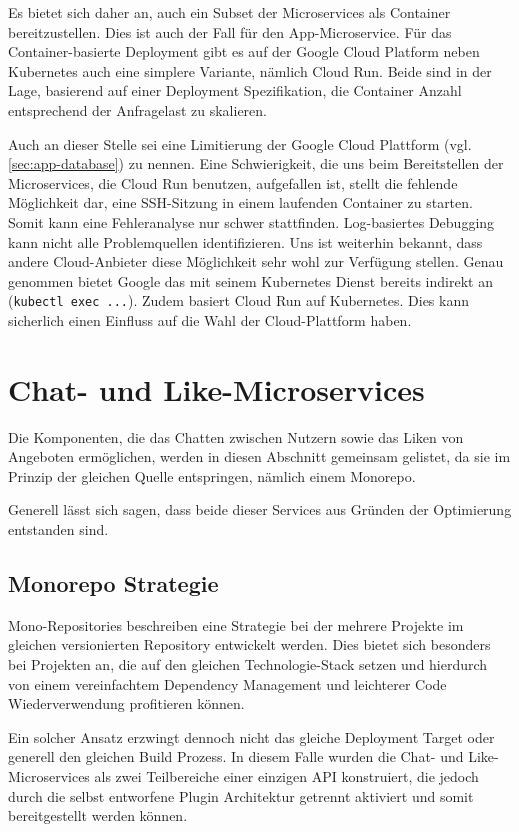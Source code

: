 \documentclass{article}
\begin{document}
Es bietet sich daher an, auch ein Subset der Microservices als Container bereitzustellen. Dies ist auch der Fall für den App-Microservice.  Für das Container-basierte Deployment gibt es auf der Google Cloud Platform neben Kubernetes auch eine simplere Variante, nämlich Cloud Run. Beide sind in der Lage, basierend auf einer Deployment Spezifikation, die Container Anzahl entsprechend der Anfragelast zu skalieren.

Auch an dieser Stelle sei eine Limitierung der Google Cloud Plattform (vgl. \autoref{sec:app-database}) zu nennen. Eine Schwierigkeit, die uns beim Bereitstellen der Microservices, die Cloud Run benutzen, aufgefallen ist, stellt die fehlende Möglichkeit dar, eine SSH-Sitzung in einem laufenden Container zu starten. Somit kann eine Fehleranalyse nur schwer stattfinden. Log-basiertes Debugging kann nicht alle Problemquellen identifizieren. Uns ist weiterhin bekannt, dass andere Cloud-Anbieter diese Möglichkeit sehr wohl zur Verfügung stellen. Genau genommen bietet Google das mit seinem Kubernetes Dienst bereits indirekt an (\texttt{kubectl exec ...}). Zudem basiert Cloud Run auf Kubernetes. Dies kann sicherlich einen Einfluss auf die Wahl der Cloud-Plattform haben.


\section{Chat- und Like-Microservices} %

Die Komponenten, die das Chatten zwischen Nutzern sowie das Liken von Angeboten ermöglichen, werden in diesen Abschnitt gemeinsam gelistet, da sie im Prinzip der gleichen Quelle entspringen, nämlich einem Monorepo.

Generell lässt sich sagen, dass beide dieser Services aus Gründen der Optimierung entstanden sind.

\subsection{Monorepo Strategie}

Mono-Repositories beschreiben eine Strategie bei der mehrere Projekte im gleichen versionierten Repository entwickelt werden. Dies bietet sich besonders bei Projekten an, die auf den gleichen Technologie-Stack setzen und hierdurch von einem vereinfachtem Dependency Management und leichterer Code Wiederverwendung profitieren können.

Ein solcher Ansatz erzwingt dennoch nicht das gleiche Deployment Target oder generell den gleichen Build Prozess. In diesem Falle wurden die Chat- und Like-Microservices als zwei Teilbereiche einer einzigen API konstruiert, die jedoch durch die selbst entworfene Plugin Architektur getrennt aktiviert und somit bereitgestellt werden können.
\end{document}
